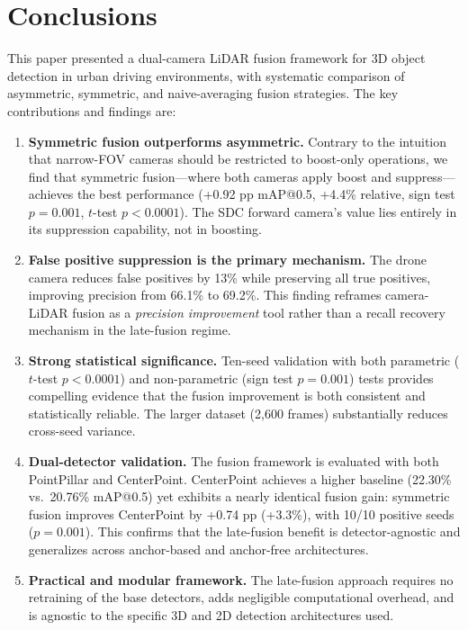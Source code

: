 \documentclass[sustainability,article,submit,moreauthors,pdftex]{Definitions/mdpi}
\begin{document}
\section{Conclusions}\label{sec:conclusions}

This paper presented a dual-camera LiDAR fusion framework for 3D object detection in urban driving environments, with systematic comparison of asymmetric, symmetric, and naive-averaging fusion strategies. The key contributions and findings are:

\begin{enumerate}[leftmargin=*,labelsep=4.9mm]
\item \textbf{Symmetric fusion outperforms asymmetric.} Contrary to the intuition that narrow-FOV cameras should be restricted to boost-only operations, we find that symmetric fusion---where both cameras apply boost and suppress---achieves the best performance (+0.92 pp mAP@0.5, +4.4\% relative, sign test $p = 0.001$, $t$-test $p < 0.0001$). The SDC forward camera's value lies entirely in its suppression capability, not in boosting.

\item \textbf{False positive suppression is the primary mechanism.} The drone camera reduces false positives by 13\% while preserving all true positives, improving precision from 66.1\% to 69.2\%. This finding reframes camera-LiDAR fusion as a \emph{precision improvement} tool rather than a recall recovery mechanism in the late-fusion regime.

\item \textbf{Strong statistical significance.} Ten-seed validation with both parametric ($t$-test $p < 0.0001$) and non-parametric (sign test $p = 0.001$) tests provides compelling evidence that the fusion improvement is both consistent and statistically reliable. The larger dataset (2{,}600 frames) substantially reduces cross-seed variance.

\item \textbf{Dual-detector validation.} The fusion framework is evaluated with both PointPillar and CenterPoint. CenterPoint achieves a higher baseline (22.30\% vs.\ 20.76\% mAP@0.5) yet exhibits a nearly identical fusion gain: symmetric fusion improves CenterPoint by +0.74 pp (+3.3\%), with 10/10 positive seeds ($p = 0.001$). This confirms that the late-fusion benefit is detector-agnostic and generalizes across anchor-based and anchor-free architectures.

\item \textbf{Practical and modular framework.} The late-fusion approach requires no retraining of the base detectors, adds negligible computational overhead, and is agnostic to the specific 3D and 2D detection architectures used.
\end{enumerate}
\end{document}
